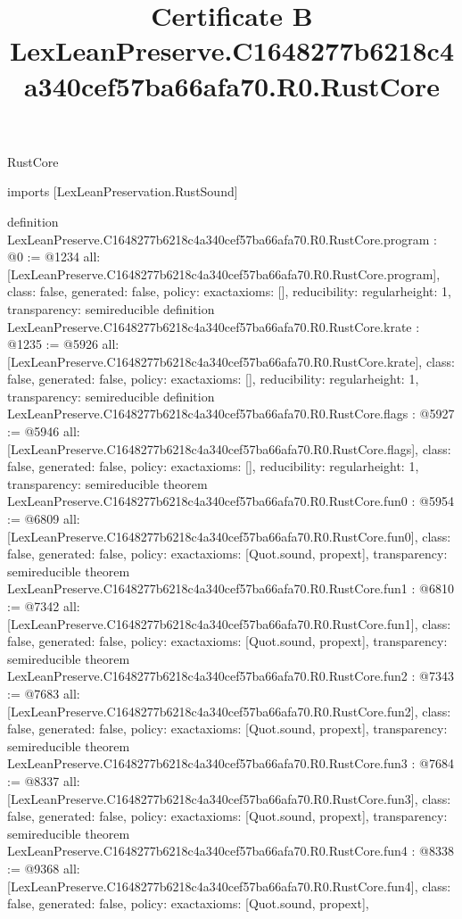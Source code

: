 \begin{lexlean}{RustCore}
\title{Certificate B LexLeanPreserve.C1648277b6218c4a340cef57ba66afa70.R0.RustCore}
\begin{coremodule}
imports [LexLeanPreservation.RustSound]

definition LexLeanPreserve.C1648277b6218c4a340cef57ba66afa70.R0.RustCore.program : @0 := @1234 {
  all: [LexLeanPreserve.C1648277b6218c4a340cef57ba66afa70.R0.RustCore.program],
  class: false,
  generated: false,
  policy: exact{axioms: []},
  reducibility: regular{height: 1},
  transparency: semireducible
}
definition LexLeanPreserve.C1648277b6218c4a340cef57ba66afa70.R0.RustCore.krate : @1235 := @5926 {
  all: [LexLeanPreserve.C1648277b6218c4a340cef57ba66afa70.R0.RustCore.krate],
  class: false,
  generated: false,
  policy: exact{axioms: []},
  reducibility: regular{height: 1},
  transparency: semireducible
}
definition LexLeanPreserve.C1648277b6218c4a340cef57ba66afa70.R0.RustCore.flags : @5927 := @5946 {
  all: [LexLeanPreserve.C1648277b6218c4a340cef57ba66afa70.R0.RustCore.flags],
  class: false,
  generated: false,
  policy: exact{axioms: []},
  reducibility: regular{height: 1},
  transparency: semireducible
}
theorem LexLeanPreserve.C1648277b6218c4a340cef57ba66afa70.R0.RustCore.fun0 : @5954 := @6809 {
  all: [LexLeanPreserve.C1648277b6218c4a340cef57ba66afa70.R0.RustCore.fun0],
  class: false,
  generated: false,
  policy: exact{axioms: [Quot.sound, propext]},
  transparency: semireducible
}
theorem LexLeanPreserve.C1648277b6218c4a340cef57ba66afa70.R0.RustCore.fun1 : @6810 := @7342 {
  all: [LexLeanPreserve.C1648277b6218c4a340cef57ba66afa70.R0.RustCore.fun1],
  class: false,
  generated: false,
  policy: exact{axioms: [Quot.sound, propext]},
  transparency: semireducible
}
theorem LexLeanPreserve.C1648277b6218c4a340cef57ba66afa70.R0.RustCore.fun2 : @7343 := @7683 {
  all: [LexLeanPreserve.C1648277b6218c4a340cef57ba66afa70.R0.RustCore.fun2],
  class: false,
  generated: false,
  policy: exact{axioms: [Quot.sound, propext]},
  transparency: semireducible
}
theorem LexLeanPreserve.C1648277b6218c4a340cef57ba66afa70.R0.RustCore.fun3 : @7684 := @8337 {
  all: [LexLeanPreserve.C1648277b6218c4a340cef57ba66afa70.R0.RustCore.fun3],
  class: false,
  generated: false,
  policy: exact{axioms: [Quot.sound, propext]},
  transparency: semireducible
}
theorem LexLeanPreserve.C1648277b6218c4a340cef57ba66afa70.R0.RustCore.fun4 : @8338 := @9368 {
  all: [LexLeanPreserve.C1648277b6218c4a340cef57ba66afa70.R0.RustCore.fun4],
  class: false,
  generated: false,
  policy: exact{axioms: [Quot.sound, propext]},
}
\end{coremodule}
\end{lexlean}

